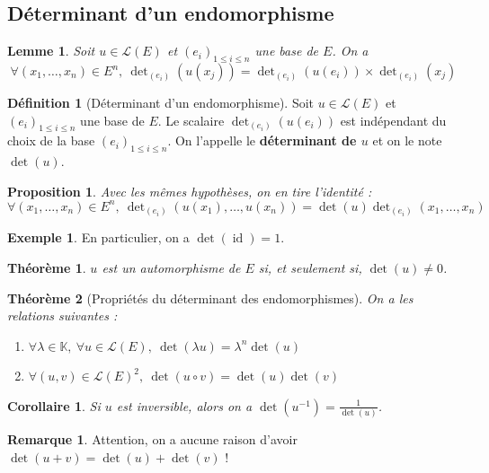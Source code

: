 \documentclass[french]{book}
\newcommand{\K}{\mathbb{K}}
\newcommand{\inv}{^{-1}}
\theoremstyle{plain}
\newtheorem{thm}{Théorème}[chapter]
\newtheorem{lem}{Lemme}[chapter]
\newtheorem{prop}{Proposition}[chapter]
\newtheorem{cor}{Corollaire}[chapter]
\theoremstyle{definition}
\newtheorem{dfn}{Définition}[chapter]
\newtheorem{exa}{Exemple}[chapter]
\newtheorem{rmq}{Remarque}[chapter]
\theoremstyle{remark}
\DeclareMathOperator{\id}{id}
\begin{document}
\subsection{Déterminant d'un endomorphisme}
\begin{lem}
	Soit $u\in\mathcal{L}(E)$ et $(e_i)_{1\leqslant i\leqslant n}$ une base de $E$. On a $$\forall(x_1,\ldots,x_n)\in E^n,\ \det\nolimits_{(e_i)}(u(x_j))=\det\nolimits_{(e_i)}(u(e_i))\times\det\nolimits_{(e_i)}(x_j)$$
\end{lem}
\begin{dfn}[Déterminant d'un endomorphisme]
	Soit $u\in\mathcal{L}(E)$ et $(e_i)_{1\leqslant i\leqslant n}$ une base de $E$. Le scalaire $\det\nolimits_{(e_i)}(u(e_i))$ est indépendant du choix de la base $(e_i)_{1\leqslant i\leqslant n}$. On l'appelle le \textbf{déterminant de $u$} et on le note $\det(u)$.
\end{dfn}
\begin{prop}
	Avec les mêmes hypothèses, on en tire l'identité : $$\forall(x_1,\ldots,x_n)\in E^n,\ \det\nolimits_{(e_i)}(u(x_1),\ldots,u(x_n))=\det(u)\det\nolimits_{(e_i)}(x_1,\ldots,x_n)$$
\end{prop}
\begin{exa}
	En particulier, on a $\det(\id)=1$.
\end{exa}
\begin{thm}
	$u$ est un automorphisme de $E$ si, et seulement si, $\det(u)\ne 0$.
\end{thm}
\begin{thm}[Propriétés du déterminant des endomorphismes]
	On a les relations suivantes :
	\begin{enumerate}
		\item $\forall\lambda\in\K,\ \forall u\in\mathcal{L}(E),\ \det(\lambda u)=\lambda^n\det(u)$
		\item $\forall(u,v)\in\mathcal{L}(E)^2,\ \det(u\circ v)=\det(u)\det(v)$
	\end{enumerate}
\end{thm}
\begin{cor}
	Si $u$ est inversible, alors on a $\displaystyle\det(u\inv)=\frac{1}{\det(u)}$.
\end{cor}
\begin{rmq} Attention, on a aucune raison d'avoir $\det(u+v)=\det(u)+\det(v)$ ! \end{rmq}
\end{document}
